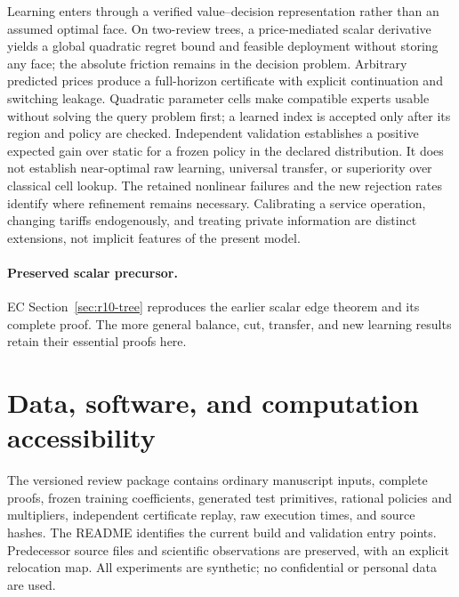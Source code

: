 \documentclass[11pt,letterpaper]{article}
\theoremstyle{definition}
\newcommand{\1}{\mathbf 1}
\begin{document}
Learning enters through a verified value--decision representation rather than an assumed optimal face. On two-review trees, a price-mediated scalar derivative yields a global quadratic regret bound and feasible deployment without storing any face; the absolute friction remains in the decision problem. Arbitrary predicted prices produce a full-horizon certificate with explicit continuation and switching leakage. Quadratic parameter cells make compatible experts usable without solving the query problem first; a learned index is accepted only after its region and policy are checked. Independent validation establishes a positive expected gain over static for a frozen policy in the declared distribution. It does not establish near-optimal raw learning, universal transfer, or superiority over classical cell lookup. The retained nonlinear failures and the new rejection rates identify where refinement remains necessary. Calibrating a service operation, changing tariffs endogenously, and treating private information are distinct extensions, not implicit features of the present model.
\paragraph{Preserved scalar precursor.} EC Section~\ref{sec:r10-tree} reproduces the earlier scalar edge theorem and its complete proof. The more general balance, cut, transfer, and new learning results retain their essential proofs here.
\section*{Data, software, and computation accessibility}
The versioned review package contains ordinary manuscript inputs, complete proofs, frozen training coefficients, generated test primitives, rational policies and multipliers, independent certificate replay, raw execution times, and source hashes. The README identifies the current build and validation entry points. Predecessor source files and scientific observations are preserved, with an explicit relocation map. All experiments are synthetic; no confidential or personal data are used.
\clearpage
\end{document}

